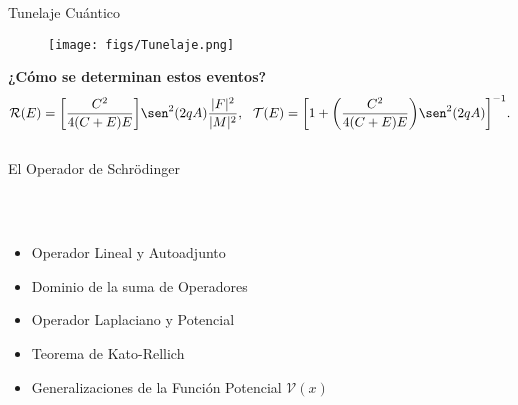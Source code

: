 \documentclass[aspectratio=1610]{beamer}
\begin{document}
\begin{frame}{Tunelaje Cuántico}

\begin{figure}[h]
    \centering
    \texttt{[image: figs/Tunelaje.png]}
\end{figure}
\textbf{\textcolor{Ocean}{¿Cómo se determinan estos eventos?}}
\begin{align*}
    \mathcal{R}(E) = \bigg[\frac{C^2}{4(C+E)E}\bigg]\sen^2(2qA)\frac{|F|^2}{|M|^2}, \:\:\:
    \mathcal{T}(E) = 
    \bigg[1+\bigg(\frac{C^2}{4(C+E)E}\bigg)\sen^2(2qA)\bigg] ^{-1}.
\end{align*}

    
\begin{columns}
\column{37em}
\end{columns}
\end{frame}
\begin{frame}
\begin{columns}
\column{37em}
\vspace{1cm}
\Huge{\centerline{El Operador de Schrödinger}}
\end{columns}
\end{frame}


\begin{frame}
\frametitle{ }
\begin{columns}
\column{37em}
\begin{itemize}\itemsep1em
  \justifying
  \item  \textcolor{Ocean}{Operador Lineal y Autoadjunto} 
  \item  \textcolor{Ocean}{Dominio de la suma de Operadores} 
  \item  \textcolor{TextGreen}{Operador Laplaciano y Potencial}
  \item  \textcolor{TextGreen}{Teorema de Kato-Rellich}
  \item  \textcolor{TextGreen}{Generalizaciones de la Función Potencial $\mathcal{V}(x)$}
\end{itemize}
\end{columns}
\end{frame}
\end{document}
